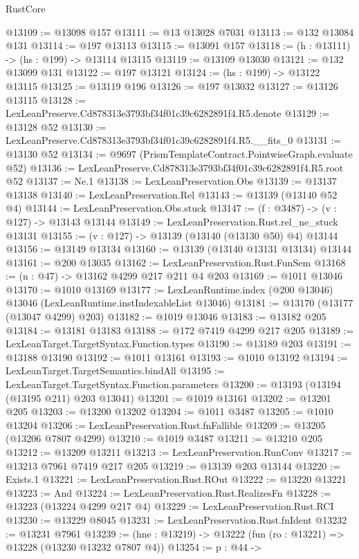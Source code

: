 \begin{lexlean}{RustCore}
\begin{coremodule}
@13109 := @13098 @157
@13111 := @13 @13028 @7031
@13113 := @132 @13084 @131
@13114 := @197 @13113
@13115 := @13091 @157
@13118 := (h : @13111) -> (hs : @199) -> @13114 @13115
@13119 := @13109 @13030
@13121 := @132 @13099 @131
@13122 := @197 @13121
@13124 := (hs : @199) -> @13122 @13115
@13125 := @13119 @196
@13126 := @197 @13032
@13127 := @13126 @13115
@13128 := LexLeanPreserve.Cd878313e3793bf34f01c39c6282891f4.R5.denote
@13129 := @13128 @52
@13130 := LexLeanPreserve.Cd878313e3793bf34f01c39c6282891f4.R5.__fits_0
@13131 := @13130 @52
@13134 := @9697 (PrismTemplateContract.PointwiseGraph.evaluate @52)
@13136 := LexLeanPreserve.Cd878313e3793bf34f01c39c6282891f4.R5.root @52
@13137 := Ne.{1}
@13138 := LexLeanPreservation.Obs
@13139 := @13137 @13138
@13140 := LexLeanPreservation.Rel
@13143 := @13139 (@13140 @52 @4)
@13144 := LexLeanPreservation.Obs.stuck
@13147 := (f : @3487) -> (v : @127) -> @13143 @13144
@13149 := LexLeanPreservation.Rust.rel_ne_stuck @13131
@13155 := (v : @127) -> @13139 (@13140 (@13130 @50) @4) @13144
@13156 := @13149 @13134
@13160 := @13139 (@13140 @13131 @13134) @13144
@13161 := @200 @13035
@13162 := LexLeanPreservation.Rust.FunSem
@13168 := (n : @47) -> @13162 @4299 @217 @211 @4 @203
@13169 := @1011 @13046
@13170 := @1010 @13169
@13177 := LexLeanRuntime.index (@200 @13046) @13046 (LexLeanRuntime.instIndexableList @13046)
@13181 := @13170 (@13177 (@13047 @4299) @203)
@13182 := @1019 @13046
@13183 := @13182 @205
@13184 := @13181 @13183
@13188 := @172 @7419 @4299 @217 @205
@13189 := LexLeanTarget.TargetSyntax.Function.types
@13190 := @13189 @203
@13191 := @13188 @13190
@13192 := @1011 @13161
@13193 := @1010 @13192
@13194 := LexLeanTarget.TargetSemantics.bindAll
@13195 := LexLeanTarget.TargetSyntax.Function.parameters
@13200 := @13193 (@13194 (@13195 @211) @203 @13041)
@13201 := @1019 @13161
@13202 := @13201 @205
@13203 := @13200 @13202
@13204 := @1011 @3487
@13205 := @1010 @13204
@13206 := LexLeanPreservation.Rust.fnFallible
@13209 := @13205 (@13206 @7807 @4299)
@13210 := @1019 @3487
@13211 := @13210 @205
@13212 := @13209 @13211
@13213 := LexLeanPreservation.RunConv
@13217 := @13213 @7961 @7419 @217 @205
@13219 := @13139 @203 @13144
@13220 := Exists.{1}
@13221 := LexLeanPreservation.Rust.ROut
@13222 := @13220 @13221
@13223 := And
@13224 := LexLeanPreservation.Rust.RealizesFn
@13228 := @13223 (@13224 @4299 @217 @4)
@13229 := LexLeanPreservation.Rust.RCI
@13230 := @13229 @8045
@13231 := LexLeanPreservation.Rust.fnIdent
@13232 := @13231 @7961
@13239 := (hne : @13219) -> @13222 (fun (ro : @13221) => @13228 (@13230 @13232 @7807 @4))
@13254 := {p : @44} ->

\end{coremodule}
\end{lexlean}
